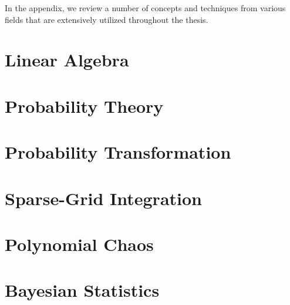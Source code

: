 In the appendix, we review a number of concepts and techniques from various
fields that are extensively utilized throughout the thesis.

\section{Linear Algebra}

\section{Probability Theory}

\section{Probability Transformation}

\section{Sparse-Grid Integration}

\section{Polynomial Chaos}

\section{Bayesian Statistics}
